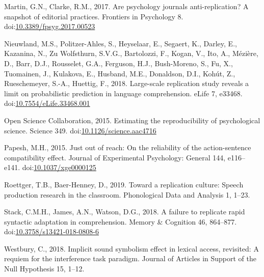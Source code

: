 \documentclass[]{elsarticle} %
\newlength{\cslhangindent}
\newenvironment{CSLReferences}[2] %
 {%
  \setlength{\parindent}{0pt}
  \ifodd #1 \everypar{\setlength{\hangindent}{\cslhangindent}}\ignorespaces\fi
  \ifnum #2 > 0
  \setlength{\parskip}{#2\baselineskip}
  \fi
 }%
 {}
\begin{document}
\begin{CSLReferences}{1}{0}
\leavevmode{}%
Martin, G.N., Clarke, R.M., 2017. Are psychology journals
anti-replication? A snapshot of editorial practices. Frontiers in
Psychology 8.
doi:\href{https://doi.org/10.3389/fpsyg.2017.00523}{10.3389/fpsyg.2017.00523}

\leavevmode{}%
Nieuwland, M.S., Politzer-Ahles, S., Heyselaar, E., Segaert, K., Darley,
E., Kazanina, N., Zu Wolfsthurn, S.V.G., Bartolozzi, F., Kogan, V., Ito,
A., Mézière, D., Barr, D.J., Rousselet, G.A., Ferguson, H.J.,
Bush-Moreno, S., Fu, X., Tuomainen, J., Kulakova, E., Husband, M.E.,
Donaldson, D.I., Kohút, Z., Rueschemeyer, S.-A., Huettig, F., 2018.
Large-scale replication study reveals a limit on probabilistic
prediction in language comprehension. eLife 7, e33468.
doi:\href{https://doi.org/10.7554/eLife.33468.001}{10.7554/eLife.33468.001}

\leavevmode{}%
Open Science Collaboration, 2015. Estimating the reproducibility of
psychological science. Science 349.
doi:\href{https://doi.org/10.1126/science.aac4716}{10.1126/science.aac4716}

\leavevmode{}%
Papesh, M.H., 2015. Just out of reach: {On} the reliability of the
action-sentence compatibility effect. Journal of Experimental
Psychology: General 144, e116--e141.
doi:\href{https://doi.org/10.1037/xge0000125}{10.1037/xge0000125}

\leavevmode{}%
Roettger, T.B., Baer-Henney, D., 2019. Toward a replication culture:
Speech production research in the classroom. Phonological Data and
Analysis 1, 1--23.

\leavevmode{}%
Stack, C.M.H., James, A.N., Watson, D.G., 2018. A failure to replicate
rapid syntactic adaptation in comprehension. Memory \& Cognition 46,
864--877.
doi:\href{https://doi.org/10.3758/s13421-018-0808-6}{10.3758/s13421-018-0808-6}

\leavevmode{}%
Westbury, C., 2018. Implicit sound symbolism effect in lexical access,
revisited: {A} requiem for the interference task paradigm. Journal of
Articles in Support of the Null Hypothesis 15, 1--12.

\end{CSLReferences}
\end{document}
